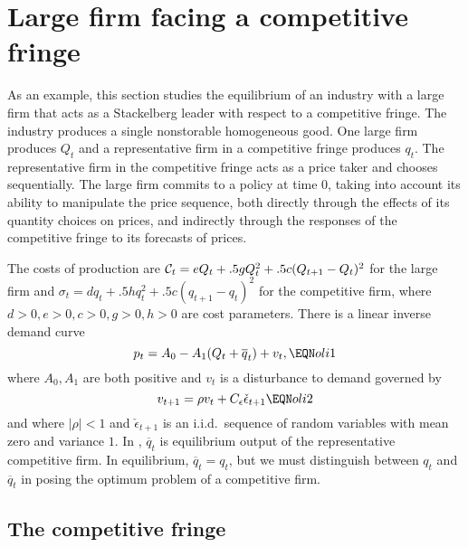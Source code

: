 \section{Large firm facing a competitive fringe}\label{sec:monopfringe}%
As an example, this section studies the equilibrium of an industry with
a large firm that acts as a Stackelberg leader with respect to a competitive
fringe.%
  The industry produces a single nonstorable homogeneous good. One
large firm produces $Q_t$ and a representative firm in a competitive
fringe produces $q_t$.  The representative firm in the competitive
fringe acts as a price taker and chooses sequentially.  The large firm
commits to a policy at time $0$, taking into account its ability to
manipulate the price sequence, both directly through the effects of
its quantity choices on prices, and indirectly through the responses of
the competitive fringe to its forecasts of prices.

  The costs of production are
${\cal C}_t = e Q_t + .5 g Q_t^2+ .5 c (Q_{t+1} - Q_{t})^2 $
for the large firm
and $ \sigma_t= d q_t + .5 h q_t^2 + .5 c (q_{t+1} - q_t)^2$
for the competitive firm,
where $d>0, e >0, c>0, g >0, h>0 $ are cost parameters.
There is a linear inverse demand curve
$$ p_t = A_0 - A_1 (Q_t + \overline q_t) + v_t, \EQN oli1 $$
where $A_0, A_1$ are both positive and  $v_t$ is a disturbance
to demand governed by
$$ v_{t+1}= \rho v_t + C_\epsilon \check \epsilon_{t+1} \EQN oli2 $$
and where $ | \rho | < 1$ and $\check \epsilon_{t+1}$ is an i.i.d.\
sequence of random variables with mean zero and variance $1$.
In , $\overline q_t$ is equilibrium output  of the representative
competitive firm.  In equilibrium, $\overline q_t = q_t$, but we
must distinguish between $q_t$ and $\overline q_t$ in posing the optimum
problem of a competitive firm.

\subsection{The competitive fringe}

